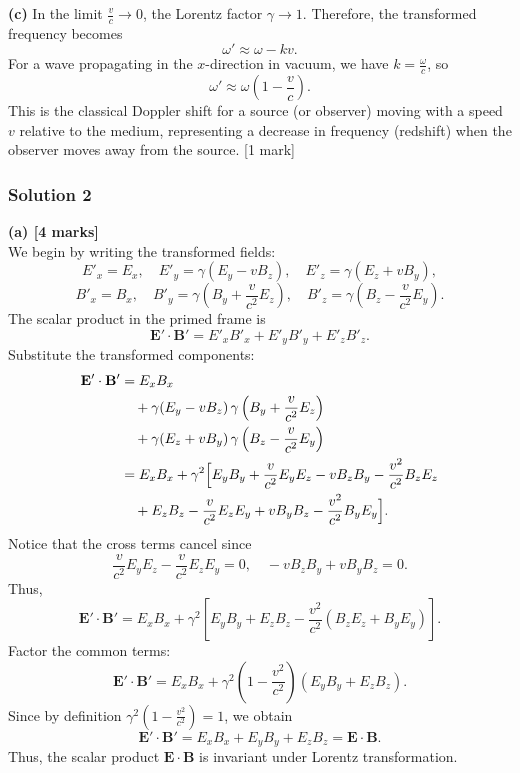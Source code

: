 \documentclass{article}
\begin{document}
\bigskip

\textbf{(c)} In the limit \( \frac{v}{c} \to 0\), the Lorentz factor \(\gamma \to 1\). Therefore, the transformed frequency becomes
\[
\omega' \approx \omega - k v.
\]
For a wave propagating in the \(x\)-direction in vacuum, we have \(k = \frac{\omega}{c}\), so
\[
\omega' \approx \omega \left(1 - \frac{v}{c}\right).
\]
This is the classical Doppler shift for a source (or observer) moving with a speed \(v\) relative to the medium, representing a decrease in frequency (redshift) when the observer moves away from the source. \hfill [1 mark]


\subsubsection{Solution 2}
\textbf{(a) [4 marks]} \\
We begin by writing the transformed fields:
\[
E'_x = E_x, \quad E'_y = \gamma (E_y - v B_z), \quad E'_z = \gamma (E_z + v B_y),
\]
\[
B'_x = B_x, \quad B'_y = \gamma \left( B_y + \frac{v}{c^2} E_z \right), \quad B'_z = \gamma \left( B_z - \frac{v}{c^2} E_y \right).
\]
The scalar product in the primed frame is
\[
\mathbf{E}'\cdot\mathbf{B}' = E'_x B'_x + E'_y B'_y + E'_z B'_z.
\]
Substitute the transformed components:
\[
\begin{split}
\mathbf{E}'\cdot\mathbf{B}' &= E_x B_x \\
&\quad + \gamma (E_y - v B_z) \, \gamma \left(B_y + \frac{v}{c^2} E_z\right) \\
&\quad + \gamma (E_z + v B_y) \, \gamma \left(B_z - \frac{v}{c^2} E_y\right) \\
&= E_x B_x + \gamma^2 \Bigl[ E_yB_y + \frac{v}{c^2}E_yE_z - vB_zB_y - \frac{v^2}{c^2}B_zE_z \\
&\quad + E_zB_z - \frac{v}{c^2}E_zE_y + vB_yB_z - \frac{v^2}{c^2}B_yE_y \Bigr].
\end{split}
\]
Notice that the cross terms cancel since
\[
\frac{v}{c^2}E_yE_z - \frac{v}{c^2}E_zE_y = 0,\quad -vB_zB_y + vB_yB_z = 0.
\]
Thus,
\[
\mathbf{E}'\cdot\mathbf{B}' = E_xB_x + \gamma^2\left[E_yB_y + E_zB_z - \frac{v^2}{c^2}(B_zE_z+B_yE_y)\right].
\]
Factor the common terms:
\[
\mathbf{E}'\cdot\mathbf{B}' = E_xB_x + \gamma^2\left(1 - \frac{v^2}{c^2}\right)(E_yB_y+E_zB_z).
\]
Since by definition \(\gamma^2\left(1-\frac{v^2}{c^2}\right)=1\), we obtain
\[
\mathbf{E}'\cdot\mathbf{B}' = E_xB_x+E_yB_y+E_zB_z = \mathbf{E}\cdot\mathbf{B}.
\]
Thus, the scalar product \(\mathbf{E}\cdot\mathbf{B}\) is invariant under Lorentz transformation.
\end{document}
